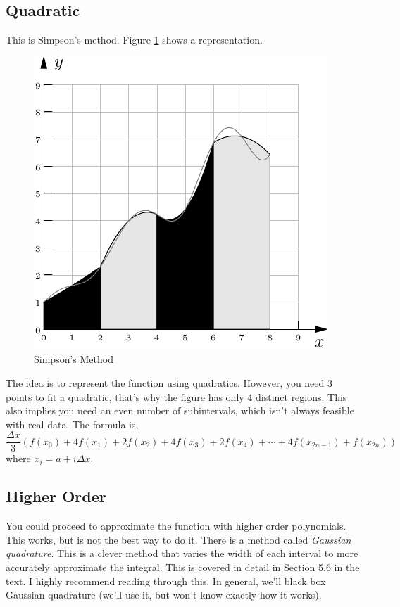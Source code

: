 \documentclass[11pt,letterpaper]{article}
\begin{document}
\subsection{Quadratic}
This is Simpson's method. Figure \ref{fig:simp} shows a representation.
\begin{figure}[!ht]
 \centering
 \includegraphics{images/fun_simp.pdf}
 \caption{Simpson's Method}
 \label{fig:simp}
\end{figure}
The idea is to represent the function using quadratics. However, you need 3 points to fit a 
quadratic, that's why the figure has only 4 distinct regions. This also implies you need an 
even number of subintervals, which isn't always feasible with real data. The formula is,
\[
\frac{\Delta x}{3}\left(f(x_0)+4f(x_1)+2f(x_2)+4f(x_3)+2f(x_4)+\cdots+4f(x_{2n-1})+f(x_{2n})\right)
\]
where $x_i = a+i\Delta x$.


\subsection{Higher Order}
You could proceed to approximate the function with higher order polynomials. This works, but 
is not the best way to do it. There is a method called \emph{Gaussian quadrature}. This is a 
clever method that varies the width of each interval to more accurately approximate the integral.
This is covered in detail in Section 5.6 in the text. I highly recommend reading through this.
In general, we'll black box Gaussian quadrature (we'll use it, but won't know exactly how it works).
\end{document}

